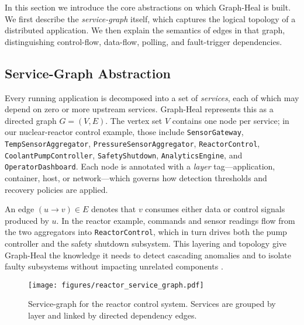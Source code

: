 \documentclass[11pt,conference]{IEEEtran}
\begin{document}
In this section we introduce the core abstractions on which Graph-Heal is built.  We first describe the \emph{service-graph} itself, which captures the logical topology of a distributed application.  We then explain the semantics of edges in that graph, distinguishing control-flow, data-flow, polling, and fault-trigger dependencies.

\subsection{Service-Graph Abstraction}
Every running application is decomposed into a set of \emph{services}, each of which may depend on zero or more upstream services.  Graph-Heal represents this as a directed graph \(G=(V,E)\).  The vertex set \(V\) contains one node per service; in our nuclear-reactor control example, those include \texttt{SensorGateway}, \texttt{TempSensorAggregator}, \texttt{PressureSensorAggregator}, \texttt{ReactorControl}, \texttt{CoolantPumpController}, \texttt{SafetyShutdown}, \texttt{AnalyticsEngine}, and \texttt{OperatorDashboard}.  Each node is annotated with a \emph{layer} tag—application, container, host, or network—which governs how detection thresholds and recovery policies are applied.

An edge \( (u \to v)\in E \) denotes that \(v\) consumes either data or control signals produced by \(u\).  In the reactor example, commands and sensor readings flow from the two aggregators into \texttt{ReactorControl}, which in turn drives both the pump controller and the safety shutdown subsystem.  This layering and topology give Graph-Heal the knowledge it needs to detect cascading anomalies and to isolate faulty subsystems without impacting unrelated components \cite{fowler2014microservices,dragoni2017microservices}.

\begin{figure}[ht]
  \centering
  \texttt{[image: figures/reactor\_service\_graph.pdf]}
  \caption{Service-graph for the reactor control system.  Services are grouped by layer and linked by directed dependency edges.}
  \label{fig:service-graph}
\end{figure}
\end{document}
